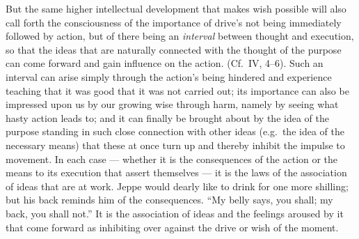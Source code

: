 \documentclass[12pt,a4paper]{book}
\newcommand{\opage}[1]{\marginnote{\footnotesize\textit{[#1]}}}
\begin{document}
\opage{382}But the same higher intellectual development that makes wish
possible will also call forth the consciousness of the importance of
drive's not being immediately followed by action, but of there being an
\emph{interval} between thought and execution, so that the ideas that are
naturally connected with the thought of the purpose can come forward and
gain influence on the action. (Cf.\ IV, 4--6). Such an interval can arise
simply through the action's being hindered and experience teaching that
it was good that it was not carried out; its importance can also be
impressed upon us by our growing wise through harm, namely by seeing what
hasty action leads to; and it can finally be brought about by the idea of
the purpose standing in such close connection with other ideas (e.g.\ the
idea of the necessary means) that these at once turn up and thereby
inhibit the impulse to movement. In each case --- whether it is the
consequences of the action or the means to its execution that assert
themselves --- it is the laws of the association of ideas that are at
work. Jeppe would dearly like to drink for one more shilling; but his
back reminds him of the consequences. ``My belly says, you shall; my
back, you shall not.'' It is the association of ideas and the feelings
aroused by it that come forward as inhibiting over against the drive or
wish of the moment.
\end{document}
